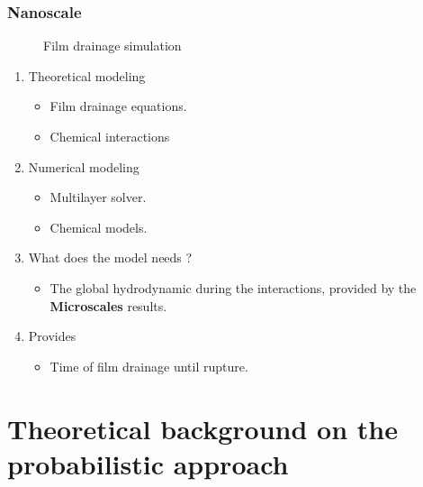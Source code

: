 \documentclass{sintefbeamer}
\begin{document}
\begin{frame}
  \frametitle{Nanoscale}

  \begin{figure}
    \caption{Film drainage simulation}
  \end{figure}

  \begin{enumerate}
    \item Theoretical modeling 
    \begin{itemize}
      \item Film drainage equations.
      \item Chemical interactions
    \end{itemize}
    \item Numerical modeling 
    \begin{itemize}
      \item Multilayer solver. 
      \item Chemical models. 
    \end{itemize}
    \item What does the model needs ? 
    \begin{itemize}
      \item The global hydrodynamic during the interactions, provided by the \textbf{Microscales} results.  
    \end{itemize}
    \item Provides 
    \begin{itemize}
      \item Time of film drainage until rupture.  
    \end{itemize}
  \end{enumerate}
\end{frame}

\begin{frame}
  \centering
\end{frame}

\section{Theoretical background on the probabilistic approach}
\end{document}
